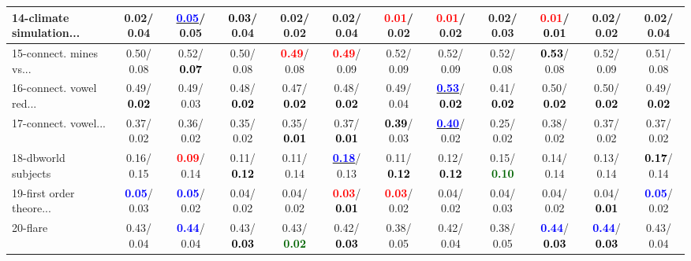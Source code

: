 \begin{table}[h]
\begin{center}
{\begin{tabular}{lc|c|c|c|c|c|c|c|c|c|c}
14-climate simulation... &   0.02/  0.04 & \underline{\textcolor{blue}{\textbf{  0.05}}}/  0.05 & \textcolor{black}{\textbf{  0.03}}/  0.04 &   0.02/  0.02 &   0.02/  0.04 & \textcolor{red}{\textbf{  0.01}}/  0.02 & \textcolor{red}{\textbf{  0.01}}/  0.02 &   0.02/  0.03 & \textcolor{red}{\textbf{  0.01}}/\textcolor{black}{\textbf{  0.01}} &   0.02/  0.02 &   0.02/  0.04 \\ \hline
15-connect. mines vs... &   0.50/  0.08 &   0.52/\textcolor{black}{\textbf{  0.07}} &   0.50/  0.08 & \textcolor{red}{\textbf{  0.49}}/  0.08 & \textcolor{red}{\textbf{  0.49}}/  0.09 &   0.52/  0.09 &   0.52/  0.09 &   0.52/  0.08 & \textcolor{black}{\textbf{  0.53}}/  0.08 &   0.52/  0.09 &   0.51/  0.08 \\
16-connect. vowel red... &   0.49/\textcolor{black}{\textbf{  0.02}} &   0.49/  0.03 &   0.48/\textcolor{black}{\textbf{  0.02}} &   0.47/\textcolor{black}{\textbf{  0.02}} &   0.48/\textcolor{black}{\textbf{  0.02}} &   0.49/  0.04 & \underline{\textcolor{blue}{\textbf{  0.53}}}/\textcolor{black}{\textbf{  0.02}} &   0.41/\textcolor{black}{\textbf{  0.02}} &   0.50/\textcolor{black}{\textbf{  0.02}} &   0.50/\textcolor{black}{\textbf{  0.02}} &   0.49/\textcolor{black}{\textbf{  0.02}} \\
17-connect. vowel... &   0.37/  0.02 &   0.36/  0.02 &   0.35/  0.02 &   0.35/\textcolor{black}{\textbf{  0.01}} &   0.37/\textcolor{black}{\textbf{  0.01}} & \textcolor{black}{\textbf{  0.39}}/  0.03 & \underline{\textcolor{blue}{\textbf{  0.40}}}/  0.02 &   0.25/  0.02 &   0.38/  0.02 &   0.37/  0.02 &   0.37/  0.02 \\
18-dbworld subjects &   0.16/  0.15 & \textcolor{red}{\textbf{  0.09}}/  0.14 &   0.11/\textcolor{black}{\textbf{  0.12}} &   0.11/  0.14 & \underline{\textcolor{blue}{\textbf{  0.18}}}/  0.13 &   0.11/\textcolor{black}{\textbf{  0.12}} &   0.12/\textcolor{black}{\textbf{  0.12}} &   0.15/\textcolor{darkgreen}{\textbf{  0.10}} &   0.14/  0.14 &   0.13/  0.14 & \textcolor{black}{\textbf{  0.17}}/  0.14 \\
19-first order theore... & \textcolor{blue}{\textbf{  0.05}}/  0.03 & \textcolor{blue}{\textbf{  0.05}}/  0.02 &   0.04/  0.02 &   0.04/  0.02 & \textcolor{red}{\textbf{  0.03}}/\textcolor{black}{\textbf{  0.01}} & \textcolor{red}{\textbf{  0.03}}/  0.02 &   0.04/  0.02 &   0.04/  0.03 &   0.04/  0.02 &   0.04/\textcolor{black}{\textbf{  0.01}} & \textcolor{blue}{\textbf{  0.05}}/  0.02 \\
20-flare &   0.43/  0.04 & \textcolor{blue}{\textbf{  0.44}}/  0.04 &   0.43/\textcolor{black}{\textbf{  0.03}} &   0.43/\textcolor{darkgreen}{\textbf{  0.02}} &   0.42/\textcolor{black}{\textbf{  0.03}} &   0.38/  0.05 &   0.42/  0.04 &   0.38/  0.05 & \textcolor{blue}{\textbf{  0.44}}/\textcolor{black}{\textbf{  0.03}} & \textcolor{blue}{\textbf{  0.44}}/\textcolor{black}{\textbf{  0.03}} &   0.43/  0.04 \\

\end{tabular}}
\end{center}
\end{table}
